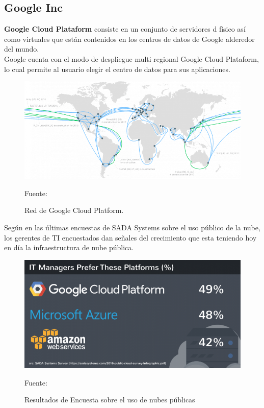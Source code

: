 \documentclass[a4paper, 12pt]{report}
\begin{document}
\subsection{Google Inc}
\begin{justify}
{\bf Google Cloud Plataform} consiste en un conjunto de servidores d f\'isico as\'i como virtuales que est\'an contenidos en los centros de datos de Google alderedor del mundo.
\\ Google cuenta con el modo de despliegue  multi regional Google Cloud Plataform, lo cual permite al usuario elegir el centro de datos para sus aplicaciones.
\end{justify}
\begin{figure}[ht]
\begin{center}
\includegraphics[scale=0.6]{google_cloud}
\end{center}
\begin{center}
\vskip -0.5cm
\caption{\small{Red de Google Cloud Platform.}}
{\small{Fuente: \cite{google_cloud}}}
\end{center}
\end{figure}
\begin{justify}
Según \cite{google_cloud} en las \'ultimas encuestas de SADA Systems sobre el uso p\'ublico de la nube, los  gerentes de TI encuestados dan se\~{n}ales del crecimiento que esta teniendo hoy en día la infraestructura de nube p\'ublica.
\end{justify}
\begin{figure}[ht]
\begin{center}
\includegraphics[scale=0.4]{encuesta}
\end{center}
\begin{center}
\vskip -0.5cm
\caption{\small{Resultados de Encuesta sobre el uso de nubes p\'ublicas}}
{\small{Fuente: \cite{google_cloud}}}
\end{center}
\end{figure}
\end{document}
